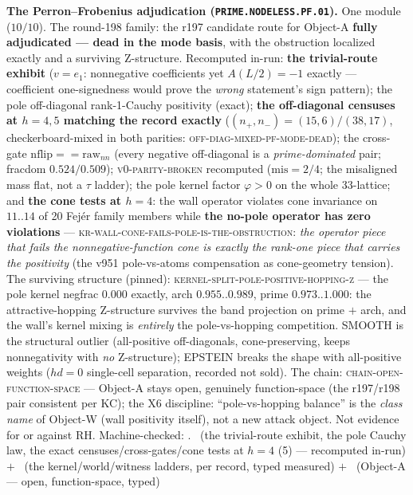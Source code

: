 \par\smallskip\noindent\textbf{The Perron--Frobenius adjudication
(\texttt{PRIME.\allowbreak NODELESS.\allowbreak PF.01}).}
One module ($10/10$).  The round-198 family: the r197 candidate
route for Object-A \textbf{fully adjudicated --- dead in the mode
basis}, with the obstruction localized exactly and a surviving
Z-structure.  Recomputed in-run: \textbf{the trivial-route
exhibit} ($v = e_1$: nonnegative coefficients yet $A(L/2) = -1$
exactly --- coefficient one-signedness would prove the
\emph{wrong} statement's sign pattern); the pole off-diagonal
rank-1-Cauchy positivity (exact); \textbf{the off-diagonal
censuses at $h = 4, 5$ matching the record exactly} ($(n_+, n_-)
= (15, 6)/(38, 17)$, checkerboard-mixed in both parities:
\textsc{off-diag-mixed-pf-mode-dead}); the cross-gate
$\mathrm{nflip} == \mathrm{raw}_{nn}$ (every negative
off-diagonal is a \emph{prime-dominated} pair; fracdom
$0.524/0.509$); \textsc{v0-parity-broken} recomputed ($\mathrm{mis}
= 2/4$; the misaligned mass flat, not a $\tau$ ladder); the pole
kernel factor $\varphi > 0$ on the whole 33-lattice; and
\textbf{the cone tests at $h = 4$}: the wall operator violates
cone invariance on $11..14$ of 20 Fej\'er family members while
\textbf{the no-pole operator has zero violations} ---
\textsc{kr-wall-cone-fails-pole-is-the-obstruction}: \emph{the
operator piece that fails the nonnegative-function cone is
exactly the rank-one piece that carries the positivity} (the v951
pole-vs-atoms compensation as cone-geometry tension).  The
surviving structure (pinned):
\textsc{kernel-split-pole-positive-hopping-z} --- the pole kernel
negfrac $0.000$ exactly, arch $0.955..0.989$, prime
$0.973..1.000$: the attractive-hopping Z-structure survives the
band projection on prime $+$ arch, and the wall's kernel mixing
is \emph{entirely} the pole-vs-hopping competition.  SMOOTH is
the structural outlier (all-positive off-diagonals,
cone-preserving, keeps nonnegativity with \emph{no} Z-structure);
EPSTEIN breaks the shape with all-positive weights ($hd = 0$
single-cell separation, recorded not sold).  The chain:
\textsc{chain-open-function-space} --- Object-A stays open,
genuinely function-space (the r197/r198 pair consistent per KC);
the X6 discipline: ``pole-vs-hopping balance'' is the \emph{class
name} of Object-W (wall positivity itself), not a new attack
object.  Not evidence for or against RH.
Machine-checked: .
\mE\ (the trivial-route exhibit, the pole Cauchy law, the exact
censuses/cross-gates/cone tests at $h = 4$ (5) --- recomputed
in-run) $+$ \mC\ (the kernel/world/witness ladders, per record,
typed measured) $+$ \mO\ (Object-A --- open, function-space,
typed)
\par\smallskip


